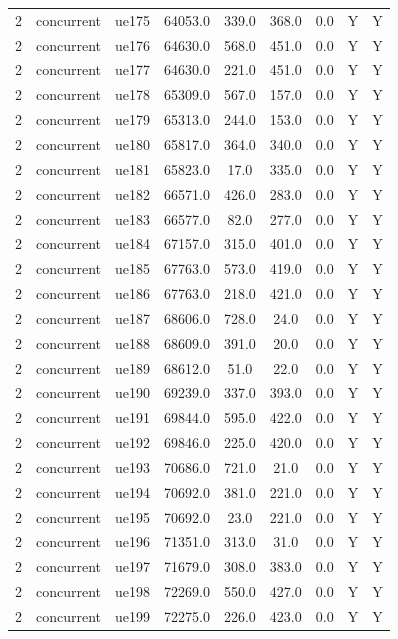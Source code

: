 \begin{table}[ht]
\begin{tabular}{|c|c|c|c|c|c|c|c|c|}
2 & concurrent & ue175 & 64053.0 & 339.0 & 368.0 & 0.0 & Y & Y \\
2 & concurrent & ue176 & 64630.0 & 568.0 & 451.0 & 0.0 & Y & Y \\
2 & concurrent & ue177 & 64630.0 & 221.0 & 451.0 & 0.0 & Y & Y \\
2 & concurrent & ue178 & 65309.0 & 567.0 & 157.0 & 0.0 & Y & Y \\
2 & concurrent & ue179 & 65313.0 & 244.0 & 153.0 & 0.0 & Y & Y \\
2 & concurrent & ue180 & 65817.0 & 364.0 & 340.0 & 0.0 & Y & Y \\
2 & concurrent & ue181 & 65823.0 & 17.0 & 335.0 & 0.0 & Y & Y \\
2 & concurrent & ue182 & 66571.0 & 426.0 & 283.0 & 0.0 & Y & Y \\
2 & concurrent & ue183 & 66577.0 & 82.0 & 277.0 & 0.0 & Y & Y \\
2 & concurrent & ue184 & 67157.0 & 315.0 & 401.0 & 0.0 & Y & Y \\
2 & concurrent & ue185 & 67763.0 & 573.0 & 419.0 & 0.0 & Y & Y \\
2 & concurrent & ue186 & 67763.0 & 218.0 & 421.0 & 0.0 & Y & Y \\
2 & concurrent & ue187 & 68606.0 & 728.0 & 24.0 & 0.0 & Y & Y \\
2 & concurrent & ue188 & 68609.0 & 391.0 & 20.0 & 0.0 & Y & Y \\
2 & concurrent & ue189 & 68612.0 & 51.0 & 22.0 & 0.0 & Y & Y \\
2 & concurrent & ue190 & 69239.0 & 337.0 & 393.0 & 0.0 & Y & Y \\
2 & concurrent & ue191 & 69844.0 & 595.0 & 422.0 & 0.0 & Y & Y \\
2 & concurrent & ue192 & 69846.0 & 225.0 & 420.0 & 0.0 & Y & Y \\
2 & concurrent & ue193 & 70686.0 & 721.0 & 21.0 & 0.0 & Y & Y \\
2 & concurrent & ue194 & 70692.0 & 381.0 & 221.0 & 0.0 & Y & Y \\
2 & concurrent & ue195 & 70692.0 & 23.0 & 221.0 & 0.0 & Y & Y \\
2 & concurrent & ue196 & 71351.0 & 313.0 & 31.0 & 0.0 & Y & Y \\
2 & concurrent & ue197 & 71679.0 & 308.0 & 383.0 & 0.0 & Y & Y \\
2 & concurrent & ue198 & 72269.0 & 550.0 & 427.0 & 0.0 & Y & Y \\
2 & concurrent & ue199 & 72275.0 & 226.0 & 423.0 & 0.0 & Y & Y \\

\end{tabular}
\end{table}
